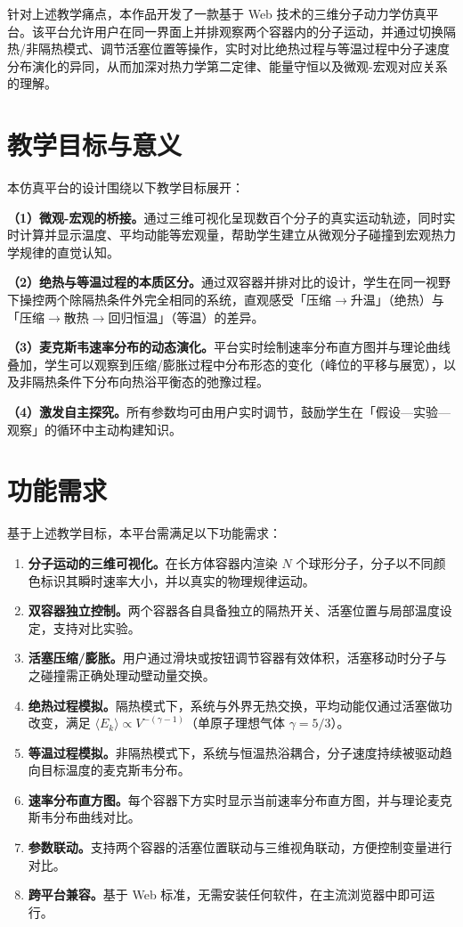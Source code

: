 \documentclass[zihao=-4,a4paper,oneside]{ctexbook}
\newcommand{\avg}[1]{\langle #1 \rangle}
\begin{document}
针对上述教学痛点，本作品开发了一款基于 Web 技术的三维分子动力学仿真平台。该平台允许用户在同一界面上并排观察两个容器内的分子运动，并通过切换隔热/非隔热模式、调节活塞位置等操作，实时对比绝热过程与等温过程中分子速度分布演化的异同，从而加深对热力学第二定律、能量守恒以及微观-宏观对应关系的理解。

\section{教学目标与意义}

本仿真平台的设计围绕以下教学目标展开：

\textbf{（1）微观-宏观的桥接。}通过三维可视化呈现数百个分子的真实运动轨迹，同时实时计算并显示温度、平均动能等宏观量，帮助学生建立从微观分子碰撞到宏观热力学规律的直觉认知。

\textbf{（2）绝热与等温过程的本质区分。}通过双容器并排对比的设计，学生在同一视野下操控两个除隔热条件外完全相同的系统，直观感受「压缩$\rightarrow$升温」（绝热）与「压缩$\rightarrow$散热$\rightarrow$回归恒温」（等温）的差异。

\textbf{（3）麦克斯韦速率分布的动态演化。}平台实时绘制速率分布直方图并与理论曲线叠加，学生可以观察到压缩/膨胀过程中分布形态的变化（峰位的平移与展宽），以及非隔热条件下分布向热浴平衡态的弛豫过程。

\textbf{（4）激发自主探究。}所有参数均可由用户实时调节，鼓励学生在「假设—实验—观察」的循环中主动构建知识。

\section{功能需求}

基于上述教学目标，本平台需满足以下功能需求：

\begin{enumerate}
  \item \textbf{分子运动的三维可视化。}在长方体容器内渲染 $N$ 个球形分子，分子以不同颜色标识其瞬时速率大小，并以真实的物理规律运动。
  \item \textbf{双容器独立控制。}两个容器各自具备独立的隔热开关、活塞位置与局部温度设定，支持对比实验。
  \item \textbf{活塞压缩/膨胀。}用户通过滑块或按钮调节容器有效体积，活塞移动时分子与之碰撞需正确处理动壁动量交换。
  \item \textbf{绝热过程模拟。}隔热模式下，系统与外界无热交换，平均动能仅通过活塞做功改变，满足 $\avg{E_k}\propto V^{-(\gamma-1)}$（单原子理想气体 $\gamma=5/3$）。
  \item \textbf{等温过程模拟。}非隔热模式下，系统与恒温热浴耦合，分子速度持续被驱动趋向目标温度的麦克斯韦分布。
  \item \textbf{速率分布直方图。}每个容器下方实时显示当前速率分布直方图，并与理论麦克斯韦分布曲线对比。
  \item \textbf{参数联动。}支持两个容器的活塞位置联动与三维视角联动，方便控制变量进行对比。
  \item \textbf{跨平台兼容。}基于 Web 标准，无需安装任何软件，在主流浏览器中即可运行。
\end{enumerate}
\end{document}
